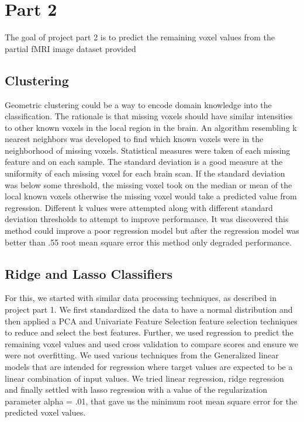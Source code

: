 \documentclass{article} %
\begin{document}
\section{Part 2}
The goal of project part 2 is to predict the remaining voxel values from the partial fMRI image dataset provided 

\subsection{Clustering}
Geometric clustering could be a way to encode domain knowledge into the classification. The rationale is that missing voxels should have similar intensities to other known voxels in the local region in the brain. An algorithm resembling k nearest neighbors was developed to find which known voxels were in the neighborhood of missing voxels. Statistical measures were taken of each missing feature and on each sample.  The standard deviation is a good measure at the uniformity of each missing voxel for each brain scan. If the standard deviation was below some threshold, the missing voxel took on the median or mean of the local known voxels otherwise the missing voxel would take a predicted value from regression. Different k values were attempted along with different standard deviation thresholds to attempt to improve performance. It was discovered this method could improve a poor regression model but after the regression model was better than .55 root mean square error this method only degraded performance. 

\subsection{Ridge and Lasso Classifiers}
For this, we started with similar data processing techniques, as described in project part 1. We first standardized the data to have a normal distribution and then applied a PCA and Univariate Feature Selection feature selection techniques to reduce and select the best features. Further, we used regression to predict the remaining voxel values and used cross validation to compare scores and ensure we were not overfitting. We used various techniques from the Generalized linear models that are intended for regression where target values are expected to be a linear combination of input values. We tried linear regression, ridge regression and finally settled with lasso regression with a value of the regularization parameter alpha = .01, that gave us the minimum root mean square error for the predicted voxel values.
\end{document}
